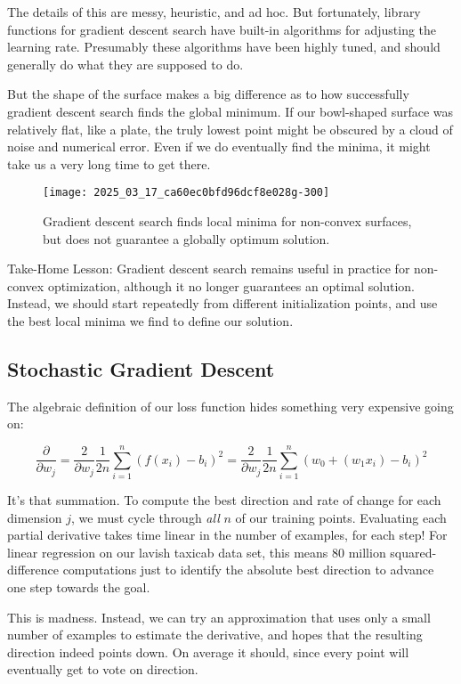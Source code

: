 \documentclass[10pt]{article}
\begin{document}
The details of this are messy, heuristic, and ad hoc. But fortunately, library functions for gradient descent search have built-in algorithms for adjusting the learning rate. Presumably these algorithms have been highly tuned, and should generally do what they are supposed to do.

But the shape of the surface makes a big difference as to how successfully gradient descent search finds the global minimum. If our bowl-shaped surface was relatively flat, like a plate, the truly lowest point might be obscured by a cloud of noise and numerical error. Even if we do eventually find the minima, it might take us a very long time to get there.

\begin{figure}[h]
    \centering
    \texttt{[image: 2025\_03\_17\_ca60ec0bfd96dcf8e028g-300]}
    \caption{Gradient descent search finds local minima for non-convex surfaces, but does not guarantee a globally optimum solution.}
\end{figure}

Take-Home Lesson: Gradient descent search remains useful in practice for non-convex optimization, although it no longer guarantees an optimal solution. Instead, we should start repeatedly from different initialization points, and use the best local minima we find to define our solution.

\subsection{Stochastic Gradient Descent}
The algebraic definition of our loss function hides something very expensive going on:

\[
\frac{\partial}{\partial w_{j}} = \frac{2}{\partial w_{j}} \frac{1}{2 n} \sum_{i=1}^{n} \left(f(x_{i}) - b_{i}\right)^{2} = \frac{2}{\partial w_{j}} \frac{1}{2 n} \sum_{i=1}^{n} \left(w_{0} + (w_{1} x_{i}) - b_{i}\right)^{2}
\]

It's that summation. To compute the best direction and rate of change for each dimension $j$, we must cycle through \textit{all} $n$ of our training points. Evaluating each partial derivative takes time linear in the number of examples, for each step! For linear regression on our lavish taxicab data set, this means 80 million squared-difference computations just to identify the absolute best direction to advance one step towards the goal.

This is madness. Instead, we can try an approximation that uses only a small number of examples to estimate the derivative, and hopes that the resulting direction indeed points down. On average it should, since every point will eventually get to vote on direction.
\end{document}
